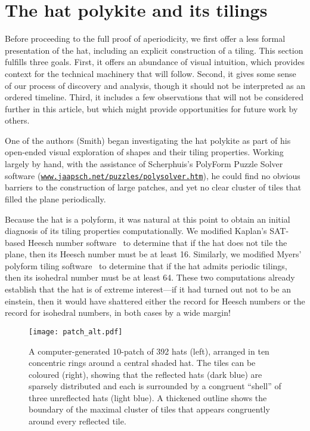 \section{The hat polykite and its tilings}
\label{sec:discussion}

\label{sec:substitution} %

Before proceeding to the full proof of aperiodicity, we 
first offer a less formal presentation of the hat, including an explicit
construction of a tiling.  This section 
fulfills three goals.  First, it offers an abundance of visual 
intuition, which provides context for the technical machinery that will
follow.  Second, it gives some sense of our process of discovery and
analysis, though it should not be interpreted as an ordered timeline.
Third, it includes a few observations that will not be 
considered further in this article, but which might provide opportunities
for future work by others.

One of the authors (Smith) began investigating the hat polykite as
part of his open-ended visual exploration of shapes and their tiling
properties.  Working largely by hand, with the assistance of
Scherphuis's PolyForm Puzzle Solver 
software (\href{https://www.jaapsch.net/puzzles/polysolver.htm}{\nolinkurl{www.jaapsch.net/puzzles/polysolver.htm}}),
he could find no obvious barriers to the construction of large patches, 
and yet no clear cluster of tiles that filled the plane periodically.

Because the hat is a polyform, it was natural at this point to
obtain an initial diagnosis of its tiling properties computationally.
We modified Kaplan's SAT-based Heesch number software~\cite{Kaplan}
to determine that if the hat does not tile the plane, then its
Heesch number must be at least 16.  Similarly, we modified Myers'
polyform tiling software~\cite{Myers} to determine that if the hat
admits periodic tilings, then its isohedral number must be at least
64.  These two computations already establish that the hat is of
extreme interest---if it had turned out not to be an einstein, then 
it would have shattered either
the record for Heesch numbers or the record for isohedral numbers,
in both cases by a wide margin!  

\begin{figure}[htp!]
\begin{center}
\texttt{[image: patch\_alt.pdf]}
\end{center}
\caption{\label{fig:patch10}A computer-generated $10$-patch of 392 hats
	(left), arranged in ten concentric rings around a central shaded hat.
	The tiles can be coloured (right), showing that the reflected 
	hats (dark blue) are sparsely distributed and each is surrounded by
	a congruent ``shell'' of three unreflected hats (light blue).
	A thickened outline shows the boundary of the maximal cluster
	of tiles that appears congruently around every reflected tile.}
\end{figure}

